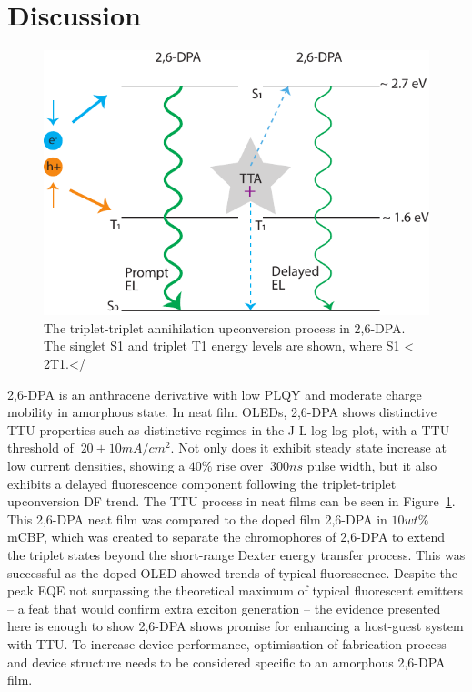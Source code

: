 \documentclass[
  letterpaper,
  DIV=11,
  numbers=noendperiod,
  oneside]{scrreprt}
\begin{document}
\hypertarget{discussion}{%
\section{Discussion}\label{discussion}}

\begin{figure}

{\centering \includegraphics{./images/TTA in DPA.pdf}

}

\caption{\label{fig-ttadpa}The triplet-triplet annihilation upconversion
process in 2,6-DPA. The singlet {S1} and triplet {T1} energy levels are
shown, where {S1 \textless{} 2T1}.\textless/}

\end{figure}

2,6-DPA is an anthracene derivative with low PLQY and moderate charge
mobility in amorphous state. In neat film OLEDs, 2,6-DPA shows
distinctive TTU properties such as distinctive regimes in the J-L
log-log plot, with a TTU threshold of \(~20\pm10 mA/cm^2\). Not only
does it exhibit steady state increase at low current densities, showing
a \(40\%\) rise over \(~300ns\) pulse width, but it also exhibits a
delayed fluorescence component following the triplet-triplet
upconversion DF trend. The TTU process in neat films can be seen in
Figure~\ref{fig-ttadpa}. This 2,6-DPA neat film was compared to the
doped film 2,6-DPA in \(10wt\%\) mCBP, which was created to separate the
chromophores of 2,6-DPA to extend the triplet states beyond the
short-range Dexter energy transfer process. This was successful as the
doped OLED showed trends of typical fluorescence. Despite the peak EQE
not surpassing the theoretical maximum of typical fluorescent emitters
-- a feat that would confirm extra exciton generation -- the evidence
presented here is enough to show 2,6-DPA shows promise for enhancing a
host-guest system with TTU. To increase device performance, optimisation
of fabrication process and device structure needs to be considered
specific to an amorphous 2,6-DPA film.
\end{document}
